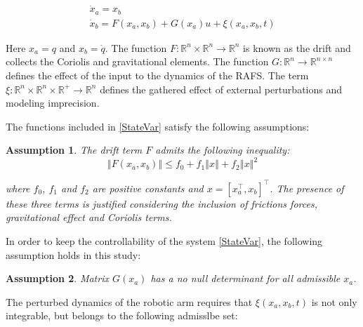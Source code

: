 \documentclass[journal,twocolumn]{IEEEtran}
\newtheorem{assumption}{Assumption}
\begin{document}
\begin{equation}
\begin{array}{c}
\dot{x}_{a}=x_{b} \\ 
\dot{x}_{b}= F \left( x_{a},x_{b}\right) +G\left( x_{a}\right) u + \xi\left( x_{a},x_{b},t\right)%
\end{array}%
\label{StateVar}
\end{equation}%

Here $x_{a} = q $ and $x_{b} = \dot{q} $. The function $F: \mathbb{R}^{n} \times \mathbb{R}^{n} \rightarrow \mathbb{R}^{n}$ is known as the drift and collects the Coriolis and gravitational elements. The function $G : \mathbb{R}^{n} \rightarrow \mathbb{R}^{n \times n}$ defines the effect of the input to the dynamics of the RAFS. The term $\xi : \mathbb{R}^{n} \times \mathbb{R}^{n} \times \mathbb{R}^{+} \rightarrow \mathbb{R}^{n }$ defines the gathered effect of external perturbations and modeling imprecision. 

The functions included in \eqref{StateVar} satisfy the following assumptions:

\begin{assumption}
The drift term $F$ admits the following inequality:
%
\begin{equation}
    \left\Vert F \left( x_{a},x_{b}\right) \right\Vert \leq f_0 + f_1 \left\Vert x \right\Vert + f_2 \left\Vert x \right\Vert^{2}
\end{equation}
 
\noindent where $f_0$, $f_1$ and $f_2$ are positive constants and $x = \left[ x^{\top}_{a}, x_{b} \right]^{\top}$. The presence of these three terms is justified considering the inclusion of frictions forces, gravitational effect and Coriolis terms. 
\end{assumption}

In order to keep the controllability of the system \eqref{StateVar}, the following assumption holds in this study:

\begin{assumption}
Matrix $G\left( x_{a}\right)$ has a no null determinant for all admissible $x_{a}$.
\end{assumption}

The perturbed dynamics of the robotic arm requires that $\xi\left( x_{a},x_{b},t\right)$ is not only integrable, but belongs to the following admisslbe set:
\end{document}
